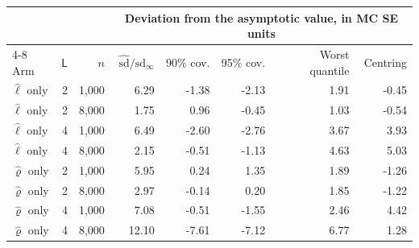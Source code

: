 \begin{tabular}{lrrrrrrr}
\toprule
 & & & \multicolumn{5}{c}{Deviation from the asymptotic value, in MC SE units} \\
\cmidrule(lr){4-8}
Arm & $\mathsf L$ & $n$ & $\hat{\mathrm{sd}}/\mathrm{sd}_\infty$ & 90\% cov. & 95\% cov. & Worst quantile & Centring \\
\midrule
$\hat\ell$ only & 2 & 1,000 & 6.29 & -1.38 & -2.13 & 1.91 & -0.45 \\
$\hat\ell$ only & 2 & 8,000 & 1.75 & 0.96 & -0.45 & 1.03 & -0.54 \\
$\hat\ell$ only & 4 & 1,000 & 6.49 & -2.60 & -2.76 & 3.67 & 3.93 \\
$\hat\ell$ only & 4 & 8,000 & 2.15 & -0.51 & -1.13 & 4.63 & 5.03 \\
$\hat\varrho$ only & 2 & 1,000 & 5.95 & 0.24 & 1.35 & 1.89 & -1.26 \\
$\hat\varrho$ only & 2 & 8,000 & 2.97 & -0.14 & 0.20 & 1.85 & -1.22 \\
$\hat\varrho$ only & 4 & 1,000 & 7.08 & -0.51 & -1.55 & 2.46 & 4.42 \\
$\hat\varrho$ only & 4 & 8,000 & 12.10 & -7.61 & -7.12 & 6.77 & 1.28 \\
\bottomrule
\end{tabular}
